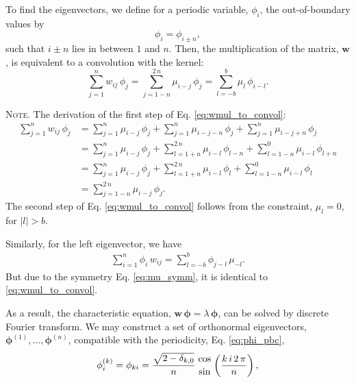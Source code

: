 \documentclass[reprint, superscriptaddress, floatfix]{revtex4-1}
\newcommand{\note}[1]{{\color{DarkGreen}\footnotesize \textsc{Note.} #1}}
\begin{document}
To find the eigenvectors,
we define for a periodic variable, $\phi_i$,
the out-of-boundary values by
%
\begin{equation}
  \phi_i = \phi_{i \pm n},
\label{eq:phi_pbc}
\end{equation}
%
such that $i \pm n$ lies in between $1$ and $n$.
%
Then, the multiplication of the matrix, $\mathbf w$,
is equivalent to a convolution with the kernel:
%
\begin{equation}
  \sum_{ j = 1 }^n
    w_{ij} \, \phi_j
  =
  \sum_{ j = 1 - n }^{ 2 \, n }
    \mu_{i - j} \, \phi_j
  =
  \sum_{ l = -b }^{ b }
    \mu_l \, \phi_{ i - l}
  .
\label{eq:wmul_to_convol}
\end{equation}
%
\note{The derivation of the first step of
  Eq. \eqref{eq:wmul_to_convol}:
\begin{align*}
  \sum_{j = 1}^n
    w_{ij} \, \phi_j
  &=
  \sum_{j = 1}^n
    \mu_{i - j} \, \phi_j
  +
  \sum_{j = 1}^n
    \mu_{i - j - n} \, \phi_j
  +
  \sum_{j = 1}^n
    \mu_{i - j + n} \, \phi_j
  \\
  &=
  \sum_{j = 1}^n
    \mu_{i - j} \, \phi_j
  +
  \sum_{l = 1+n}^{2 \, n}
    \mu_{i - l} \, \phi_{l - n}
  +
  \sum_{l = 1-n}^0
    \mu_{i - l} \, \phi_{l + n}
  \\
  &=
  \sum_{j = 1}^n
    \mu_{i - j} \, \phi_j
  +
  \sum_{l = 1+n}^{2 \, n}
    \mu_{i - l} \, \phi_{l}
  +
  \sum_{l = 1-n}^0
    \mu_{i - l} \, \phi_{l}
  \\
  &=
  \sum_{j = 1-n}^{2 \, n}
    \mu_{i - j} \, \phi_j
  .
\end{align*}
The second step of Eq. \eqref{eq:wmul_to_convol}
follows from the constraint, $\mu_l = 0$, for $|l| > b$.

Similarly,
for the left eigenvector, we have
\begin{align*}
  \sum_{ i = 1 }^n
    \phi_i \, w_{ij}
  =
  \sum_{ l = -b }^b
    \phi_{j - l} \, \mu_{-l}
  .
\end{align*}
But due to the symmetry Eq. \eqref{eq:mu_symm},
it is identical to \eqref{eq:wmul_to_convol}.
}
%
As a result, the characteristic equation,
$\mathbf w \, \pmb\phi = \lambda \, \pmb\phi$,
can be solved by discrete Fourier transform.
%
We may construct a set of orthonormal eigenvectors,
$\pmb\phi^{(1)}, \dots, \pmb\phi^{(n)}$,
compatible with the periodicity, Eq. \eqref{eq:phi_pbc},
%
\begin{equation}
  \phi^{(k)}_i
  =
  \phi_{ki}
  =
  \frac{ \sqrt{ 2 - \delta_{k,0} } } { n }
  \,
  {\cos \atop \sin}
  \left(
    \frac{ k \, i \, 2 \, \pi }
         {      n             }
  \right)
  ,
  \notag
\end{equation}
\end{document}
